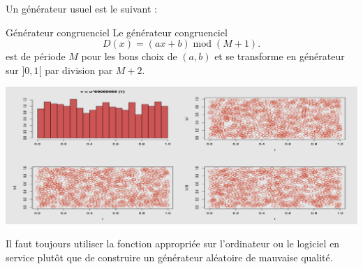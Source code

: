Un générateur usuel est le suivant :

\begin{definition}{Générateur congruenciel}
Le g\'en\'erateur congruenciel
$$
   D(x) = (ax + b) \; {\mathrm {mod}} \; (M+1) .
$$
est de p\'eriode $M$ pour les bons choix de $(a,b)$ et se transforme en
g\'en\'erateur sur $]0,1[$ par division par $M+2$. \\
\end{definition}


\begin{center}
\includegraphics[scale=0.3]{figures/calcul/congru.png}
\end{center}

Il faut toujours utiliser la fonction appropri\'ee sur l'ordinateur ou le logiciel en service
plut\^ot que de construire un g\'en\'erateur al\'eatoire de mauvaise qualit\'e. 
